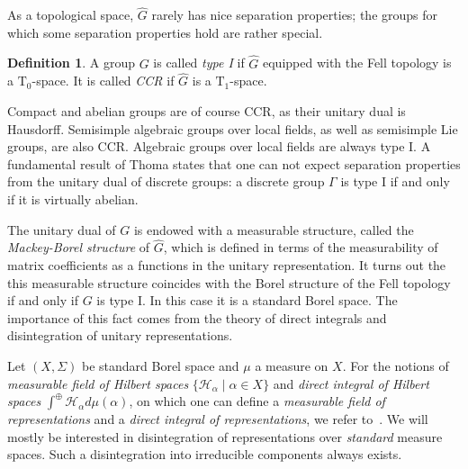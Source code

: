 \documentclass[12pt,reqno]{amsart}
\theoremstyle{definition}
\newtheorem{definition}[theorem]{Definition}
\begin{document}
As a topological space, $\widehat{G}$ rarely has nice separation properties; the groups for which some separation properties hold are rather special.
\begin{definition}\label{def:typeI}
    A group $G$ is called \emph{type I} if $\widehat{G}$ equipped with the Fell topology is a $\mathrm{T}_0$-space. It is called \emph{CCR} if $\widehat{G}$ is a $\mathrm{T}_1$-space.
\end{definition}
Compact and abelian groups are of course CCR, as their unitary dual is Hausdorff. Semisimple algebraic groups over local fields, as well as semisimple Lie groups, are also CCR. Algebraic groups over local fields are always type I. A fundamental result of Thoma states that one can not expect separation properties from the unitary dual of discrete groups: a discrete group $\Gamma$ is type I if and only if it is virtually abelian. 

The unitary dual of $G$ is endowed with a measurable structure, called the \emph{Mackey-Borel structure} of $\widehat{G}$, which is defined in terms of the measurability of matrix coefficients as a functions in the unitary representation. It turns out the this measurable structure coincides with the Borel structure of the Fell topology if and only if $G$ is type I. In this case it is a standard Borel space. The importance of this fact comes from the theory of direct integrals and disintegration of unitary representations.

Let $(X, \Sigma)$ be standard Borel space and $\mu$ a measure on $X$. For the notions of \emph{measurable field of Hilbert spaces} $\{\mathcal{H}_{\alpha} \mid \alpha \in X\}$ and \emph{direct integral of Hilbert spaces} $\int^{\oplus}\mathcal H_{\alpha} d\mu(\alpha)$, on which one can define a \emph{measurable field of representations} and a \emph{direct integral of representations}, we refer to~\cite[\S 7.4]{Folland}. We will mostly be interested in disintegration of representations over \emph{standard} measure spaces. Such a disintegration into irreducible components always exists.
\end{document}
